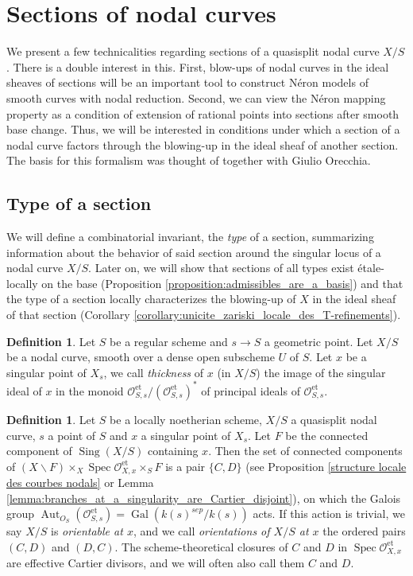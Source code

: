 \documentclass[a4paper,10pt,twoside]{article}
\newcommand{\on}[1]{\operatorname{#1}}
\renewcommand{\O}{\mathcal{O}}
\DeclareMathOperator{\spec}{Spec}
\DeclareMathOperator{\sing}{Sing}
\DeclareMathOperator{\aut}{Aut}
\DeclareMathOperator{\gal}{Gal}
\theoremstyle{definition}
\newtheorem{defi}[thm]{Definition}
\theoremstyle{remark}
\renewcommand{\on}[1]{\operatorname{#1}}
\begin{document}
\section{Sections of nodal curves}

We present a few technicalities regarding sections of a quasisplit nodal curve $X/S$. There is a double interest in this. First, blow-ups of nodal curves in the ideal sheaves of sections will be an important tool to construct N\'eron models of smooth curves with nodal reduction. Second, we can view the N\'eron mapping property as a condition of extension of rational points into sections after smooth base change. Thus, we will be interested in conditions under which a section of a nodal curve factors through the blowing-up in the ideal sheaf of another section. The basis for this formalism was thought of together with Giulio Orecchia.

\subsection{Type of a section}

We will define a combinatorial invariant, the \emph{type} of a section, summarizing information about the behavior of said section around the singular locus of a nodal curve $X/S$. Later on, we will show that sections of all types exist \'etale-locally on the base (Proposition \ref{proposition:admissibles_are_a_basis}) and that the type of a section locally characterizes the blowing-up of $X$ in the ideal sheaf of that section (Corollary \ref{corollary:unicite_zariski_locale_des_T-refinements}).


\begin{defi}
Let $S$ be a regular scheme and $s\to S$ a geometric point. Let $X/S$ be a nodal curve, smooth over a dense open subscheme $U$ of $S$. Let $x$ be a singular point of $X_s$, we call \emph{thickness} of $x$ (in $X/S$) the image of the singular ideal of $x$ in the monoid $\O_{S,s}^{\on{et}}/(\O_{S,s}^{\on{et}})^*$ of principal ideals of $\O_{S,s}^{\on{et}}$.
\end{defi}



\begin{defi}\label{definition:orientation}
Let $S$ be a locally noetherian scheme, $X/S$ a quasisplit nodal curve, $s$ a point of $S$ and $x$ a singular point of $X_s$. Let $F$ be the connected component of $\sing(X/S)$ containing $x$. Then the set of connected components of $(X\backslash F)\times_X \spec \O_{X,x}^{\on{et}}\times_S F$ is a pair $\{C,D\}$ (see Proposition \ref{structure locale des courbes nodals} or Lemma \ref{lemma:branches_at_a_singularity_are_Cartier_disjoint}), on which the Galois group $\aut_{O_S}(\O_{S,s}^{\on{et}})=\gal(k(s)^{sep}/k(s))$ acts. If this action is trivial, we say $X/S$ is \emph{orientable at $x$}, and we call \emph{orientations of $X/S$ at $x$} the ordered pairs $(C,D)$ and $(D,C)$. The scheme-theoretical closures of $C$ and $D$ in $\spec \O_{X,x}^{\on{et}}$ are effective Cartier divisors, and we will often also call them $C$ and $D$.
\end{defi}
\end{document}
